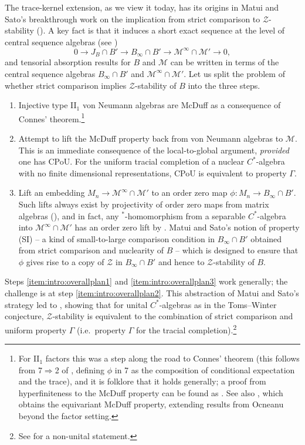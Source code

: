 \documentclass[a4paper,11pt]{amsart}
\theoremstyle{definition}
\numberwithin{equation}{section}
\numberwithin{theorem}{section}
\newcommand{\Z}{\mathcal Z}
\newcommand{\M}{\mathcal{M}}
\begin{document}
The trace-kernel extension, as we view it today, has its origins in Matui and Sato's breakthrough work on the implication from strict comparison to $\Z$-stability (\cite{MS12}). A key fact is that it induces a short exact sequence at the level of central sequence algebras (see \cite[Theorem~3.3]{KR14})
\begin{equation}
    0\longrightarrow J_B\cap B'\longrightarrow B_\infty\cap B'\longrightarrow \M^\infty\cap \mathcal M'\longrightarrow 0,
\end{equation}
and tensorial absorption results for $B$ and $\M$ can be written in terms of the central sequence algebras $B_\infty\cap B'$ and $\M^\infty\cap \M'$.  Let us split the problem of whether strict comparison implies $\Z$-stability of $B$ into the three steps. 
\begin{enumerate}
    \item Injective type II$_1$ von Neumann algebras are McDuff as a consequence of Connes' theorem.\footnote{For II$_1$ factors this was a step along the road to Connes' theorem (this follows from 7$\Rightarrow$2 of \cite[Theorem~5.1]{Co76}, defining $\phi$ in 7 as the composition of conditional expectation and the trace), and it is folklore that it holds generally; a proof from hyperfiniteness to the McDuff property can be found as \cite[Proposition 1.6]{CETW}.  See also \cite{SW23b}, which obtains the equivariant McDuff property, extending results from Ocneanu beyond the factor setting.}
    \item Attempt to lift the McDuff property back from von Neumann algebras to $\M$.  This is an immediate consequence of the local-to-global argument, \emph{provided} one has CPoU. For the uniform tracial completion of a nuclear $C^*$-algebra with no finite dimensional representations, CPoU is equivalent to property $\Gamma$.
    \item Lift an embedding $M_n\to \mathcal M^\infty\cap \M'$ to an order zero map $\phi\colon M_n\to B_\infty\cap B'$. Such lifts always exist by projectivity of order zero maps from matrix algebras (\cite[Theorem~4.9]{Loring97}), and in fact, any $^*$-homomorphism from a separable $C^*$-algebra into $\mathcal M^\infty\cap \M'$ has an order zero lift by \cite[Propositions~4.5 and 4.6]{KR14}.  Matui and Sato's notion of property (SI) -- a kind of small-to-large comparison condition in $B_\infty\cap B'$  obtained from strict comparison and nuclearity of $B$ -- which is designed to ensure that $\phi$ gives rise to a copy of $\Z$ in $B_\infty\cap B'$ and hence to $\Z$-stability of $B$.
\end{enumerate}
Steps \ref{item:intro:overallplan1} and \ref{item:intro:overallplan3} work generally; the challenge is at step \ref{item:intro:overallplan2}.  This abstraction of Matui and Sato's strategy led to \cite[Theorem 5.6]{CETW}, showing that for unital $C^*$-algebras as in the Toms--Winter conjecture, $\Z$-stability is equivalent to the combination of strict comparison and uniform property $\Gamma$ (i.e.\ property $\Gamma$ for the tracial completion).\footnote{See \cite[Theorem~A]{CE2} for a non-unital statement.}
\end{document}
